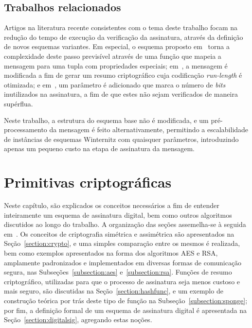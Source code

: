 \documentclass{ufsctex/ufsctex}
\begin{document}
\section{Trabalhos relacionados}\label{section:related}

Artigos na literatura recente consistentes com o tema deste trabalho focam na
redução do tempo de execução da verificação da assinatura, através da definição
de novos esquemas variantes. Em especial, o esquema proposto
em~\cite{Cruz:inproc:2016:oct} torna a complexidade deste passo previsível
através de uma função que mapeia a mensagem para uma tupla com propriedades
especiais; em~\cite{Steinwandt:article:2008:oct}, a mensagem é modificada a fim
de gerar um resumo criptográfico cuja codificação \emph{run-length} é
otimizada; e em~\cite{McGrew:report:2018:apr}, um parâmetro é adicionado que
marca o número de \emph{bits} inutilizados na assinatura, a fim de que estes
não sejam verificados de maneira supérflua.

Neste trabalho, a estrutura do esquema base não é modificada, e um
pré-processamento da mensagem é feito alternativamente, permitindo a
escalabilidade de instâncias de esquemas Winternitz com quaisquer parâmetros,
introduzindo apenas um pequeno custo na etapa de assinatura da mensagem.

\chapter{Primitivas criptográficas}\label{chapter:primitives}

Neste capítulo, são explicados os conceitos necessários a fim de entender
inteiramente um esquema de assinatura digital, bem como outros algoritmos
discutidos ao longo do trabalho. A organização das seções assemelha-se à
seguida em~\cite[Capítulo 2]{Gathen:book:2015}. Os conceitos de
criptografia simétrica e assimétrica são apresentados na
Seção~\ref{section:crypto}, e uma simples comparação entre os mesmos é
realizada, bem como exemplos apresentados na forma dos algoritmos AES e RSA,
amplamente padronizados e implementados em diversas formas de comunicação
segura, nas Subseções~\ref{subsection:aes} e~\ref{subsection:rsa}. Funções de
resumo criptográfico, utilizadas para que o processo de assinatura seja menos
custoso e mais seguro, são discutidas na Seção~\ref{section:hashfunc}, e um
exemplo de construção teórica por trás deste tipo de função na
Subseção~\ref{subsection:sponge}; por fim, a definição formal de um esquema de
assinatura digital é apresentada na Seção~\ref{section:digitalsig}, agregando
estas noções.
\end{document}
